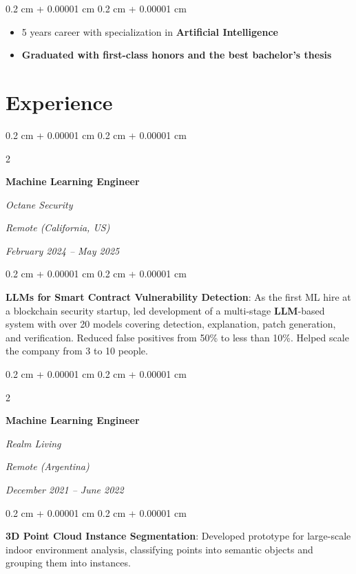 \documentclass[10pt, letterpaper]{article}
\newenvironment{highlights}{
	\begin{itemize}[
		topsep=0.10 cm,
		parsep=0.10 cm,
		partopsep=0pt,
		itemsep=0pt,
		leftmargin=0.4 cm + 10pt
	]
	}{
	\end{itemize}
} %
\newenvironment{onecolentry}{
	\begin{adjustwidth}{
		0.2 cm + 0.00001 cm
	}{
		0.2 cm + 0.00001 cm
	}
	}{
	\end{adjustwidth}
} %
\newenvironment{twocolentry}[2][]{
	\onecolentry
	\def\secondColumn{#2}
	\setcolumnwidth{\fill, 5.5 cm}
	\begin{paracol}{2}
	}{
		\switchcolumn \raggedleft \secondColumn
	\end{paracol}
	\endonecolentry
} %
\newcommand{\dlterm}[1]{\textbf{#1}}
\begin{document}
	\vspace{0.10 cm}
	\begin{onecolentry}
		\begin{highlights}
			\item 5 years career with specialization in \dlterm{Artificial Intelligence}
			\item \textbf{Graduated with first-class honors and the best bachelor's thesis}
		\end{highlights}
	\end{onecolentry}


	\section{Experience}

	\begin{twocolentry}{
		\textit{Remote (California, US)}
		
		\textit{February 2024 – May 2025}}
		\textbf{Machine Learning Engineer}
		
		\textit{Octane Security}
	\end{twocolentry}

	\vspace{0.10 cm}
	\begin{onecolentry}
		\textbf{\dlterm{LLMs} for Smart Contract Vulnerability Detection}: As the first ML hire at a blockchain security startup, led development of a multi-stage \dlterm{LLM}-based system with over 20 models covering detection, explanation, patch generation, and verification. Reduced false positives from 50\% to less than 10\%. Helped scale the company from 3 to 10 people.
	\end{onecolentry}

	\vspace{0.2 cm}

	\begin{twocolentry}{
		\textit{Remote (Argentina)}
		
		\textit{December 2021 – June 2022}}
		\textbf{Machine Learning Engineer}
		
		\textit{Realm Living}
	\end{twocolentry}

	\vspace{0.10 cm}
	\begin{onecolentry}
		\textbf{3D Point Cloud Instance Segmentation}: Developed prototype for large-scale indoor environment analysis, classifying points into semantic objects and grouping them into instances.
	\end{onecolentry}
\end{document}
